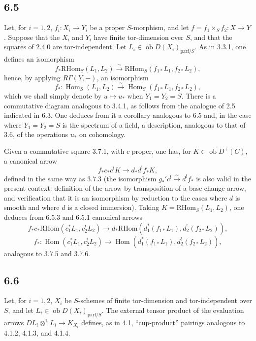 \documentclass[11pt]{article}
\DeclareMathOperator{\Hom}{Hom}
\providecommand{\RHom}{\mathrm{RHom}}
\providecommand{\RHom}{\mathrm{RHom}}
\providecommand{\Hom}{\operatorname{Hom}}
\providecommand{\RHom}{\mathrm R\mathcal{H}om}
\providecommand{\RHom}{\mathrm{RHom}}
\begin{document}
\subsection*{6.5}
Let, for $i=1,2$, $f_i:X_i\to Y_i$ be a proper $S$-morphism, and let $f=f_1\times_Sf_2:X\to Y$. Suppose that the $X_i$ and $Y_i$ have finite tor-dimension over $S$, and that the squares of 2.4.0 are tor-independent. Let $L_i\in\operatorname{ob}D(X_i)_{\mathrm{parf}/S}$. As in 3.3.1, one defines an isomorphism
\begin{equation}
\tag{6.5.1}
f_*\RHom_S(L_1,L_2)\xrightarrow{\sim}\RHom_S(f_{1*}L_1,f_{2*}L_2),
\end{equation}
hence, by applying $R\Gamma(Y,-)$, an isomorphism
\begin{equation}
\tag{6.5.2}
f_*:\Hom_S(L_1,L_2)\xrightarrow{\sim}\Hom_S(f_{1*}L_1,f_{2*}L_2),
\end{equation}
which we shall simply denote by $u\mapsto u_*$ when $Y_1=Y_2=S$. There is a commutative diagram analogous to 3.4.1, as follows from the analogue of 2.5 indicated in 6.3. One deduces from it a corollary analogous to 6.5 and, in the case where $Y_1=Y_2=S$ is the spectrum of a field, a description, analogous to that of 3.6, of the operations $u_*$ on cohomology.

Given a commutative square 3.7.1, with $c$ proper, one has, for $K\in\operatorname{ob}D^+(C)$, a canonical arrow
\begin{equation}
\tag{6.5.3}
f_*c_*c^!K\longrightarrow d_*d^!f_*K,
\end{equation}
defined in the same way as 3.7.3 (the isomorphism $g_*'c^!\xrightarrow{\sim}d^!f_*$ is also valid in the present context: definition of the arrow by transposition of a base-change arrow, and verification that it is an isomorphism by reduction to the cases where $d$ is smooth and where $d$ is a closed immersion). Taking $K=\RHom_S(L_1,L_2)$, one deduces from 6.5.3 and 6.5.1 canonical arrows
\begin{equation}
\tag{6.5.4}
f_*c_*\RHom(c_1^*L_1,c_2^!L_2)\longrightarrow d_*\RHom(d_1^*(f_{1*}L_1),d_2^!(f_{2*}L_2)),
\end{equation}
\begin{equation}
\tag{6.5.5}
f_*:\Hom(c_1^*L_1,c_2^!L_2)\longrightarrow\Hom(d_1^*(f_{1*}L_1),d_2^!(f_{2*}L_2)),
\end{equation}
analogous to 3.7.5 and 3.7.6.

\subsection*{6.6}
Let, for $i=1,2$, $X_i$ be $S$-schemes of finite tor-dimension and tor-independent over $S$, and let $L_i\in\operatorname{ob}D(X_i)_{\mathrm{parf}/S}$. The external tensor product of the evaluation arrows $DL_i\otimes^{\mathbf L}L_i\to K_{X_i}$ defines, as in 4.1, ``cup-product'' pairings analogous to 4.1.2, 4.1.3, and 4.1.4.
\end{document}
